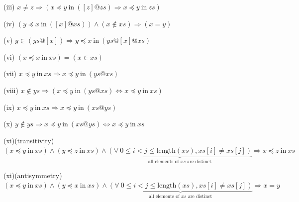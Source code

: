 \documentclass[a4 paper, 12pt]{article}
\begin{document}
{\begin{flushleft}
    (iii)
    $x \neq z \Longrightarrow (x \preceq y~\text{in}~([z] @ zs) \Longrightarrow x \preceq y ~\text{in}~zs)$
\end{flushleft}

\begin{flushleft}
    (iv)
    $(y \preceq x~\text{in}~([x] @ xs)) \wedge (x \notin xs) \Longrightarrow (x = y)$
\end{flushleft}

\begin{flushleft}
    (v)
    $y \in (ys @ [x]) \Longrightarrow y \preceq x~\text{in}~(ys @ [x] @ xs)$
\end{flushleft} 

\begin{flushleft}
    (vi)
    $(x \preceq x~\text{in}~xs) = (x \in xs)$
\end{flushleft}

\begin{flushleft}
    (vii)
    $x \preceq y~\text{in}~xs \Longrightarrow x \preceq y~\text{in}~(ys @ xs)$
\end{flushleft}

\begin{flushleft}
    (viii)
    $x \notin ys \Longrightarrow (x \preceq y~\text{in}~(ys @ xs) \Longleftrightarrow x \preceq y~\text{in}~xs)$
\end{flushleft}

\begin{flushleft}
    (ix)
    $x \preceq y~\text{in}~xs \Longrightarrow x \preceq y~\text{in}~(xs @ ys)$
\end{flushleft}

\begin{flushleft}
    (x)
    $y \notin ys \Longrightarrow x \preceq y~\text{in}~(xs @ ys) \Longleftrightarrow x \preceq y~\text{in}~xs$
\end{flushleft}

\begin{flushleft}
    (xi)(transitivity)
    $(x \preceq y~\text{in}~xs) \wedge (y \preceq z~\text{in}~xs) \wedge \underset{\text{all elements of $xs$ are distinct}}{\underbrace{(\forall~0 \leq i < j \leq \text{length}(xs), xs[i] \neq xs[j])}} \Longrightarrow x \preceq z~\text{in}~xs$
\end{flushleft}

\begin{flushleft}
    (xi)(antisymmetry)
    $(x \preceq y~\text{in}~xs) \wedge (y \preceq x~\text{in}~xs) \wedge \underset{\text{all elements of $xs$ are distinct}}{\underbrace{(\forall~0 \leq i < j \leq \text{length}(xs), xs[i] \neq xs[j])}} \Longrightarrow x = y$
\end{flushleft}

}
\end{document}

